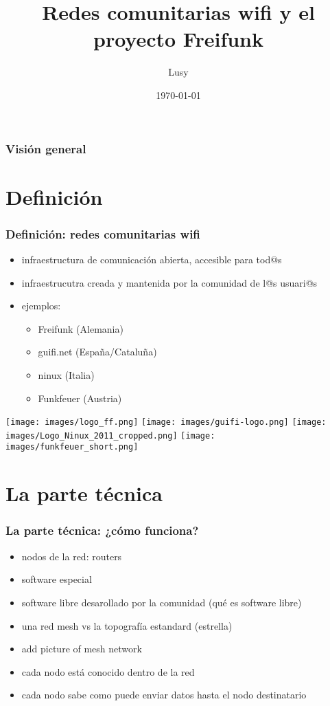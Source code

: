 \documentclass[12pt, xcolor=table]{beamer}
\begin{document}
\title{Redes comunitarias wifi y el proyecto Freifunk}
\author{Lusy}
\date{\today}

\begin{frame}
    \titlepage
\end{frame}

\begin{frame}
    \frametitle{Visión general}
    \tableofcontents
\end{frame}

\section{Definición}
\begin{frame}
  \frametitle{Definición: redes comunitarias wifi}
    \begin{itemize}
      \item infraestructura de comunicación abierta, accesible para tod@s
      \item infraestrucutra creada y mantenida por la comunidad de l@s usuari@s
      \item ejemplos:
        \begin{itemize}
          \item Freifunk (Alemania)
          \item guifi.net (España/Cataluña)
          \item ninux (Italia)
          \item Funkfeuer (Austria)
        \end{itemize}
    \end{itemize}
    \texttt{[image: images/logo\_ff.png]}
    \hspace{6pt}
    \texttt{[image: images/guifi-logo.png]}
    \hspace{6pt}
    \texttt{[image: images/Logo\_Ninux\_2011\_cropped.png]}
    \hspace{6pt}
    \texttt{[image: images/funkfeuer\_short.png]}
\end{frame}

\section{La parte técnica}
\begin{frame}
  \frametitle{La parte técnica: ¿cómo funciona?}
    \begin{itemize}
      \item nodos de la red: routers
      \item software especial
      \item software libre desarollado por la comunidad (qué es software libre)
      \item una red mesh vs la topografía estandard (estrella)
      \item add picture of mesh network
      \item cada nodo está conocido dentro de la red
      \item cada nodo sabe como puede enviar datos hasta el nodo destinatario
    \end{itemize}
\end{frame}
\end{document}
